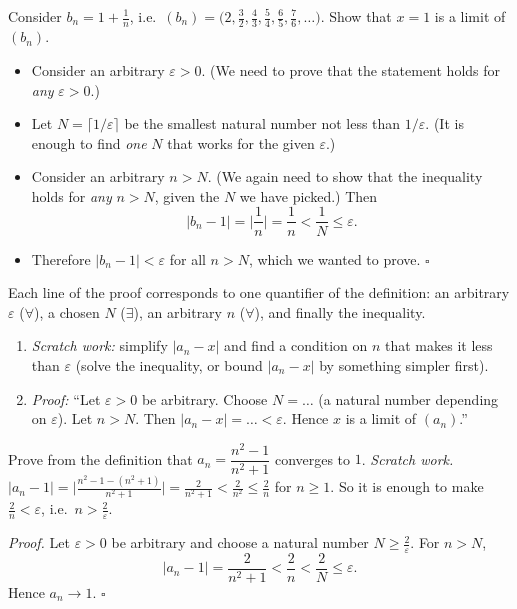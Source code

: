 \begin{example}
Consider $b_n=1+\frac1n$, i.e.\ $(b_n)=\big(2,\tfrac32,\tfrac43,\tfrac54,\tfrac65,\tfrac76,\dots\big)$. Show that $x=1$ is a limit of
$(b_n)$. 
\solution
\begin{itemize}
  \item Consider an arbitrary $\varepsilon>0$. (We need to prove that the statement holds for \emph{any} $\varepsilon>0$.)
  \item Let $N=\lceil1/\varepsilon\rceil$ be the smallest natural number not less than $1/\varepsilon$. (It is enough to find \emph{one}
  $N$ that works for the given $\varepsilon$.)
  \item Consider an arbitrary $n>N$. (We again need to show that the inequality holds for \emph{any} $n>N$, given the $N$ we have
  picked.) Then
  \[
  |b_n-1|=\Big|\frac1n\Big|=\frac1n<\frac1N\le\varepsilon.
  \]
  \item Therefore $|b_n-1|<\varepsilon$ for all $n>N$, which we wanted to prove. $\square$
\end{itemize}
Each line of the proof corresponds to one quantifier of the definition: an arbitrary $\varepsilon$ ($\forall$), a chosen $N$
($\exists$), an arbitrary $n$ ($\forall$), and finally the inequality.
\end{example}

\begin{core}
\begin{enumerate}[label=\arabic*.]
  \item \emph{Scratch work:} simplify $|a_n-x|$ and find a condition on $n$ that makes it less than $\varepsilon$ (solve the
  inequality, or bound $|a_n-x|$ by something simpler first).
  \item \emph{Proof:} ``Let $\varepsilon>0$ be arbitrary. Choose $N=\dots$ (a natural number depending on $\varepsilon$). Let $n>N$.
  Then $|a_n-x|=\dots<\varepsilon$. Hence $x$ is a limit of $(a_n)$.''
\end{enumerate}
\end{core}

\begin{example}
Prove from the definition that $a_n=\dfrac{n^2-1}{n^2+1}$ converges to $1$.
\solution
\emph{Scratch work.} $|a_n-1|=\Big|\frac{n^2-1-(n^2+1)}{n^2+1}\Big|=\frac{2}{n^2+1}<\frac2{n^2}\le\frac2n$ for $n\ge1$. So it is enough to
make $\frac2n<\varepsilon$, i.e.\ $n>\frac2\varepsilon$.

\emph{Proof.} Let $\varepsilon>0$ be arbitrary and choose a natural number $N\ge\frac2\varepsilon$. For $n>N$,
\[
|a_n-1|=\frac{2}{n^2+1}<\frac2n<\frac2N\le\varepsilon.
\]
Hence $a_n\to1$. $\square$
\end{example}

